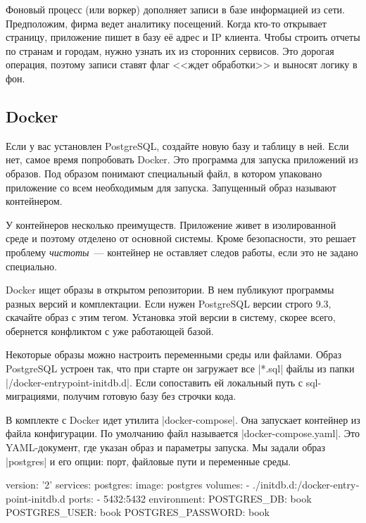 Фоновый процесс (или воркер) дополняет записи в базе информацией из
сети. Предположим, фирма ведет аналитику посещений. Когда кто-то открывает
страницу, приложение пишет в базу е\"{е} адрес и IP клиента. Чтобы строить
отчеты по странам и городам, нужно узнать их из сторонних сервисов. Это дорогая
операция, поэтому записи ставят флаг <<ждет обработки>> и выносят логику в фон.

\subsection{Docker}

\label{docker-db}

Если у вас установлен PostgreSQL, создайте новую базу и таблицу в ней. Если нет,
самое время попробовать Docker. Это программа для запуска приложений из
образов. Под образом понимают специальный файл, в котором упаковано приложение
со всем необходимым для запуска. Запущенный образ называют контейнером.

У контейнеров несколько преимуществ. Приложение живет в изолированной среде и
поэтому отделено от основной системы. Кроме безопасности, это решает проблему
\emph{чистоты}~--- контейнер не оставляет следов работы, если это не задано
специально.

Docker ищет образы в открытом репозитории. В нем публикуют программы разных
версий и комплектации. Если нужен PostgreSQL версии строго 9.3, скачайте образ с
этим тегом. Установка этой версии в систему, скорее всего, обернется конфликтом
с уже работающей базой.

Некоторые образы можно настроить переменными среды или файлами. Образ PostgreSQL
устроен так, что при старте он загружает все \spverb|*.sql| файлы из папки
\spverb|/docker-entrypoint-initdb.d|. Если сопоставить ей локальный путь с
sql-миграциями, получим готовую базу без строчки кода.

В комплекте с Docker идет утилита \spverb|docker-compose|. Она запускает
контейнер из файла конфигурации. По умолчанию файл называется
\spverb|docker-compose.yaml|. Это YAML-документ, где указан образ и параметры
запуска. Мы задали образ \spverb|postgres| и его опции: порт, файловые пути и
переменные среды.

\begin{english}
  \begin{yaml}
version: '2'
services:
  postgres:
    image: postgres
    volumes:
      - ./initdb.d:/docker-entrypoint-initdb.d
    ports:
      - 5432:5432
    environment:
      POSTGRES_DB: book
      POSTGRES_USER: book
      POSTGRES_PASSWORD: book
  \end{yaml}
\end{english}


